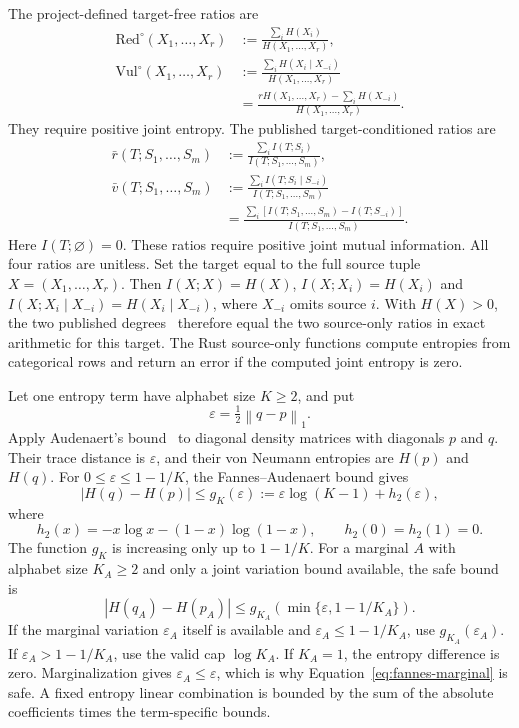 \documentclass[11pt]{article}
\theoremstyle{definition}
\newcommand{\normone}[1]{\left\lVert #1\right\rVert_1}
\begin{document}
The project-defined target-free ratios are
\begin{align}
  \mathrm{Red}^{\circ}(X_1,\ldots,X_r)
    &:=\frac{\sum_iH(X_i)}{H(X_1,\ldots,X_r)},\\
  \mathrm{Vul}^{\circ}(X_1,\ldots,X_r)
    &:=\frac{\sum_iH(X_i\mid X_{-i})}{H(X_1,\ldots,X_r)}\\
    &=\frac{rH(X_1,\ldots,X_r)-\sum_iH(X_{-i})}
            {H(X_1,\ldots,X_r)}.
\end{align}
They require positive joint entropy.  The published target-conditioned ratios are
\begin{align}
  \bar r(T;S_1,\ldots,S_m)
    &:=\frac{\sum_iI(T;S_i)}{I(T;S_1,\ldots,S_m)},\\
  \bar v(T;S_1,\ldots,S_m)
    &:=\frac{\sum_iI(T;S_i\mid S_{-i})}{I(T;S_1,\ldots,S_m)}\\
    &=\frac{\sum_i\left[I(T;S_1,\ldots,S_m)-I(T;S_{-i})\right]}
            {I(T;S_1,\ldots,S_m)}.
\end{align}
Here $I(T;\varnothing)=0$. These ratios require positive joint mutual information. All four
ratios are unitless. Set the target equal to the full source tuple $X=(X_1,\ldots,X_r)$.
Then $I(X;X)=H(X)$, $I(X;X_i)=H(X_i)$ and $I(X;X_i\mid X_{-i})=H(X_i\mid X_{-i})$,
where $X_{-i}$ omits source $i$. With $H(X)>0$, the two published degrees~\cite{gutknecht2025}
therefore equal the two source-only ratios in exact arithmetic for this target. The Rust
source-only functions compute entropies from categorical rows and return an error if the
computed joint entropy is zero.

Let one entropy term have alphabet size $K\ge2$, and put
\begin{equation}
  \varepsilon=\tfrac12\normone{q-p}.
\end{equation}
Apply Audenaert's bound~\cite{audenaert2007} to diagonal density matrices with diagonals $p$ and
$q$.  Their trace distance is $\varepsilon$, and their von Neumann entropies are $H(p)$ and $H(q)$.
For $0\le\varepsilon\le1-1/K$, the Fannes--Audenaert bound gives
\begin{equation}\label{eq:fannes}
  |H(q)-H(p)|
  \le g_K(\varepsilon)
  :=\varepsilon\log(K-1)+h_2(\varepsilon),
\end{equation}
where
\begin{equation}
  h_2(x)=-x\log x-(1-x)\log(1-x),
  \qquad h_2(0)=h_2(1)=0.
\end{equation}
	The function $g_K$ is increasing only up to $1-1/K$.  For a marginal $A$ with alphabet size
	$K_A\ge2$ and only a joint variation bound available, the safe bound is
\begin{equation}\label{eq:fannes-marginal}
  |H(q_A)-H(p_A)|
  \le
  g_{K_A}\!\left(\min\{\varepsilon,1-1/K_A\}\right).
	\end{equation}
	If the marginal variation $\varepsilon_A$ itself is available and
	$\varepsilon_A\le1-1/K_A$, use $g_{K_A}(\varepsilon_A)$.  If
	$\varepsilon_A>1-1/K_A$, use the valid cap $\log K_A$.  If $K_A=1$, the entropy difference is
		zero.  Marginalization gives $\varepsilon_A\le\varepsilon$, which is why
		Equation~\eqref{eq:fannes-marginal} is safe.  A fixed entropy linear combination is bounded by
		the sum of the absolute coefficients times the term-specific bounds.
\end{document}
